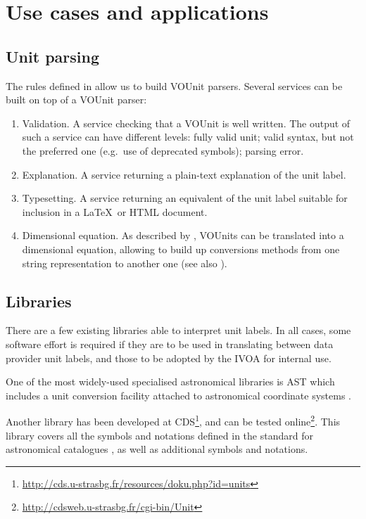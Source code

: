 \documentclass[11pt,notitlepage,onecolumn]{ivoa}
\def\eg{e.g.~}
\begin{document}
\section{Use cases and applications\label{sec:useCase}}

\subsection{Unit parsing}

The rules defined in  allow us to build VOUnit parsers.
Several services can be built on top of a VOUnit parser:

\begin{enumerate}
\item Validation. A service checking that a VOUnit is well written. The output
of such a service can have different levels: fully valid unit; valid syntax, but
not the preferred one (\eg  use of deprecated symbols); parsing error. 
\item Explanation. A service returning a plain-text explanation of the unit label.
\item Typesetting. A service returning an equivalent of the unit label suitable for inclusion in
a \LaTeX\ or HTML document.
\item Dimensional equation. As described by \citet{osuna05}, VOUnits can be translated
into a dimensional equation, allowing to build up conversions methods from one string 
representation to another one (see also ). 
\end{enumerate}

\subsection{Libraries\label{sec:libraries}}

There are a few existing libraries able to interpret unit labels.
In all cases,
some software effort is required if they are to be used in translating
between data provider unit labels, and those to be adopted by
the IVOA for internal use.

One of the most widely-used specialised
astronomical libraries is AST which includes a unit conversion
facility attached to astronomical coordinate systems \citep{berry12}.

Another library has been developed at
CDS\footnote{\url{http://cds.u-strasbg.fr/resources/doku.php?id=units}},
and can be tested online\footnote{\url{http://cdsweb.u-strasbg.fr/cgi-bin/Unit}}. This library covers all
the symbols and notations defined in the standard for astronomical catalogues \citep[\S3.2]{cds00}, as well as
additional symbols and notations.
\end{document}
